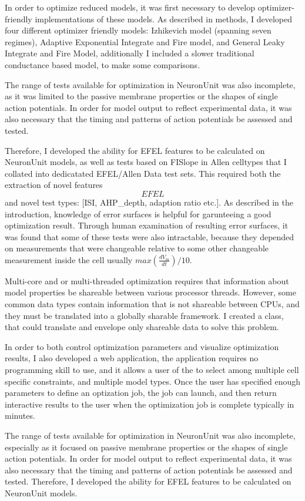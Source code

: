 
In order to optimize reduced models, it was first necessary to develop optimizer-friendly implementations of these models. As described in methods, I developed four different optimizer friendly models: Izhikevich model (spanning seven regimes), Adaptive Exponential Integrate and Fire model, and General Leaky Integrate and Fire Model, additionally I included a slower traditional conductance based model, to make some comparisons.

The range of tests available for optimization in NeuronUnit was also incomplete, as it was limited to the passive membrane properties or the shapes of single action potentials.  In order for model output to reflect experimental data, it was also necessary that the timing and patterns of action potentials be assessed and tested. 

Therefore, I developed the ability for EFEL features to be calculated on NeuronUnit models, as well as tests based on FISlope in Allen celltypes that I collated into dedicatated EFEL/Allen Data test sets. This required both the extraction of novel features \[EFEL\] and novel test types: [ISI, AHP\_depth, adaption ratio etc.]. As described in the introduction, knowledge of error surfaces is helpful for garunteeing a good optimization result. Through human examination of resulting error surfaces, it was found that some of these tests were also intractable, because they depended on measurements that were changeable relative to some other changeable measurement inside the cell usually $max(\frac{dV_{m}}{dt})/10$.

Multi-core and or multi-threaded optimization requires that information about model properties be shareable between various processor threads. However, some common data types contain information that is not shareable between CPUs, and they must be translated into a globally sharable framework. I created a class, that could translate and envelope only shareable data to solve this problem.

In order to both control optimization parameters and visualize optimization results, I also developed a web application, the application requires no programming skill to use, and it allows a user of the to select among multiple cell specific constraints, and multiple model types. Once the user has specified enough parameters to define an optization job, the job can launch, and then return interactive results to the user when the optimization job is complete typically in minutes.


The range of tests available for optimization in NeuronUnit was also incomplete, especially as it focused on passive membrane properties or the shapes of single action potentials.  In order for model output to reflect experimental data, it was also necessary that the timing and patterns of action potentials be assessed and tested.  Therefore, I developed the ability for EFEL features to be calculated on NeuronUnit models. 

